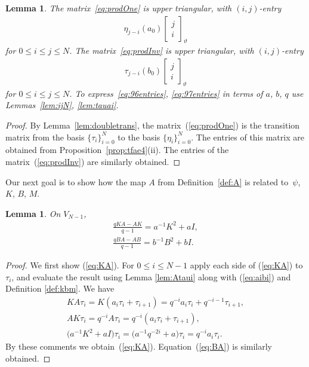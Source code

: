 \documentclass[pdftex]{sigma}
\numberwithin{equation}{section}
\newtheorem{Lemma}[Theorem]{Lemma}
\begin{document}
\begin{Lemma} The matrix~\eqref{eq:prodOne} is upper triangular, with $(i,j)$-entry
\begin{gather}
 \eta_{j-i} (a_0)
\left[\begin{matrix} j \\
i \end{matrix} \right]_\vartheta
\label{eq:96entries}
\end{gather}
for $0 \leq i\leq j\leq N$.
The matrix~\eqref{eq:prodInv} is upper triangular, with $(i,j)$-entry
\begin{gather}\label{eq:97entries}
 \tau_{j-i} (b_0)
\left[\begin{matrix} j \\
i \end{matrix} \right]_\vartheta
\end{gather}
for $0 \leq i\leq j\leq N$.
To express~\eqref{eq:96entries},
\eqref{eq:97entries} in terms of
$a$, $b$, $q$ use
Lemmas~{\rm \ref{lem:ijN}}, {\rm \ref{lem:tauai}}.
\end{Lemma}
\begin{proof}
By Lemma~\ref{lem:doubletrans}, the matrix~(\ref{eq:prodOne}) is the transition matrix from
the basis
$\lbrace \tau_i\rbrace_{i=0}^N$ to the basis
$\lbrace \eta_i\rbrace_{i=0}^N$.
The entries of this matrix are obtained
from Proposition~\ref{prop:tfae4}(ii).
The entries of the matrix~(\ref{eq:prodInv}) are similarly obtained.
\end{proof}

Our next goal is to show how the map $A$
from Definition~\ref{def:A} is related to~$\psi$,
$K$,
$B$,
$M$.
\begin{Lemma}\label{lem:AvsKB}
On $V_{N-1}$,
\begin{gather}\label{eq:KA}
\frac{qKA-AK}{q-1} = a^{-1} K^2+ a I,\\
\label{eq:BA}
\frac{qBA-AB}{q-1} = b^{-1} B^2+ b I.
\end{gather}
\end{Lemma}
\begin{proof}
We first show (\ref{eq:KA}).
For $0 \leq i \leq N-1$ apply
each side of
(\ref{eq:KA}) to $\tau_i$, and evaluate the result using
Lemma
\ref{lem:Ataui} along with
(\ref{eq:aibi})
and
Definition
\ref{def:kbm}. We have
\begin{gather*}
KA\tau_i = K(a_i \tau_i + \tau_{i+1}) = q^{-i} a_i \tau_i + q^{-i-1}\tau_{i+1},\\
AK\tau_i = q^{-i}A\tau_i = q^{-i}(a_i \tau_i + \tau_{i+1}),\\
\big(a^{-1}K^2+ a I\big)\tau_i =\big(a^{-1}q^{-2i}+ a\big)\tau_i =
q^{-i}a_i \tau_i.
\end{gather*}
By these comments we obtain~(\ref{eq:KA}). Equation~(\ref{eq:BA}) is similarly obtained.
\end{proof}
\end{document}
